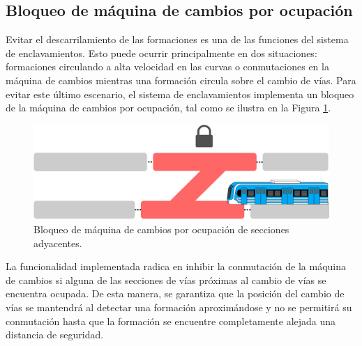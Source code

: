 \subsection{Bloqueo de máquina de cambios por ocupación}

	Evitar el descarrilamiento de las formaciones es una de las funciones del sistema de enclavamientos. Esto puede ocurrir principalmente en dos situaciones: formaciones circulando a alta velocidad en las curvas o conmutaciones en la máquina de cambios mientras una formación circula sobre el cambio de vías. Para evitar este último escenario, el sistema de enclavamientos implementa un bloqueo de la máquina de cambios por ocupación, tal como se ilustra en la Figura \ref{fig:ACG_ocupacion}.

    \begin{figure}[!h]
        \centering
        \includegraphics[width=1\textwidth]{Figuras/ocupacion}
        \centering\caption{Bloqueo de máquina de cambios por ocupación de secciones adyacentes.}
        \label{fig:ACG_ocupacion}
    \end{figure}

	La funcionalidad implementada radica en inhibir la conmutación de la máquina de cambios si alguna de las secciones de vías próximas al cambio de vías se encuentra ocupada. De esta manera, se garantiza que la posición del cambio de vías se mantendrá al detectar una formación aproximándose y no se permitirá su conmutación hasta que la formación se encuentre completamente alejada una distancia de seguridad. 